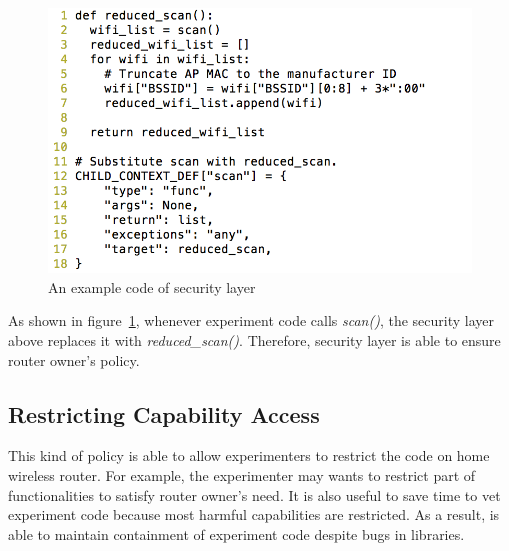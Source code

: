 \begin{figure}%
\centering
\includegraphics[width=0.8\columnwidth]{figure/example.png}
\caption{An example code of security layer}
\label{fig-examplecode}
\end{figure}

As shown in figure~\ref{fig-examplecode}, whenever experiment code calls \textit{scan()}, the security layer above replaces it with \textit{reduced\_scan()}. Therefore, security layer is able to ensure router owner's policy.

\subsection{Restricting Capability Access}
This kind of policy is able to allow experimenters to restrict the code on home wireless router. For example, the experimenter may wants to restrict part of functionalities to satisfy router owner's need. It is also useful to save time to vet experiment code because most harmful capabilities are restricted. As a result, \sysname is able to maintain containment of experiment code despite bugs in libraries.
 
